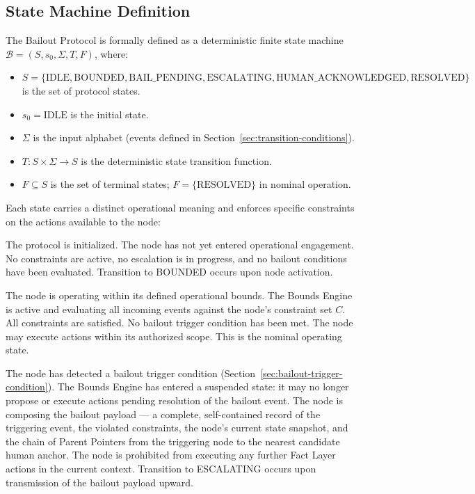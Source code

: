 \subsection{State Machine Definition}
\label{sec:state-machine-definition}

The Bailout Protocol is formally defined as a deterministic finite state machine $\mathcal{B} = (S, s_0, \Sigma, T, F)$, where:

\begin{itemize}
    \item $S = \{ \text{IDLE}, \text{BOUNDED}, \text{BAIL\_PENDING}, \text{ESCALATING}, \text{HUMAN\_ACKNOWLEDGED}, \text{RESOLVED} \}$ is the set of protocol states.
    \item $s_0 = \text{IDLE}$ is the initial state.
    \item $\Sigma$ is the input alphabet (events defined in Section~\ref{sec:transition-conditions}).
    \item $T: S \times \Sigma \rightarrow S$ is the deterministic state transition function.
    \item $F \subseteq S$ is the set of terminal states; $F = \{ \text{RESOLVED} \}$ in nominal operation.
\end{itemize}

Each state carries a distinct operational meaning and enforces specific constraints on the actions available to the node:

\begin{definition}[IDLE]
\label{def:state-idle}
The protocol is initialized. The node has not yet entered operational engagement. No constraints are active, no escalation is in progress, and no bailout conditions have been evaluated. Transition to BOUNDED occurs upon node activation.
\end{definition}

\begin{definition}[BOUNDED]
\label{def:state-bounded}
The node is operating within its defined operational bounds. The Bounds Engine is active and evaluating all incoming events against the node's constraint set $C$. All constraints are satisfied. No bailout trigger condition has been met. The node may execute actions within its authorized scope. This is the nominal operating state.
\end{definition}

\begin{definition}
\label{def:state-bail-pending}
The node has detected a bailout trigger condition (Section~\ref{sec:bailout-trigger-condition}). The Bounds Engine has entered a suspended state: it may no longer propose or execute actions pending resolution of the bailout event. The node is composing the bailout payload — a complete, self-contained record of the triggering event, the violated constraints, the node's current state snapshot, and the chain of Parent Pointers from the triggering node to the nearest candidate human anchor. The node is prohibited from executing any further Fact Layer actions in the current context. Transition to ESCALATING occurs upon transmission of the bailout payload upward.
\end{definition}

